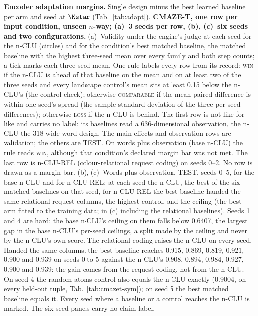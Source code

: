\textbf{Encoder adaptation margins.} Single design minus the best learned baseline per arm and seed at $\Kstar$ (Tab.~\ref{tab:adapt}).
\textbf{CMAZE-T, one row per input condition, unseen $n$-way; (a)~3 seeds per row, (b), (c)~six seeds and two configurations.} (a)~Validity under the engine's judge at each seed for the n-CLU (circles) and for the condition's best matched baseline, the matched baseline with the highest three-seed mean over every family and both step counts; a tick marks each three-seed mean. One rule labels every row from its record: \textsc{win} if the n-CLU is ahead of that baseline on the mean and on at least two of the three seeds and every landscape control's mean sits at least 0.15 below the n-CLU's (the control check); otherwise \textsc{comparable} if the mean paired difference is within one seed's spread (the sample standard deviation of the three per-seed differences); otherwise \textsc{loss} if the n-CLU is behind. The first row is not like-for-like and carries no label: its baselines read a 636-dimensional observation, the n-CLU the 318-wide word design. The main-effects and observation rows are validation; the others are TEST. On words plus observation (base n-CLU) the rule reads \textsc{win}, although that condition's declared margin bar was not met. The last row is n-CLU-REL (colour-relational request coding) on seeds 0--2. No row is drawn as a margin bar. (b), (c)~Words plus observation, TEST, seeds 0--5, for the base n-CLU and for n-CLU-REL: at each seed the n-CLU, the best of the six matched baselines on that seed, for n-CLU-REL the best baseline handed the same relational request columns, the highest control, and the ceiling (the best arm fitted to the training data; in (c) including the relational baselines). Seeds 1 and 4 are hard: the base n-CLU's ceiling on them falls below 0.6407, the largest gap in the base n-CLU's per-seed ceilings, a split made by the ceiling and never by the n-CLU's own score. The relational coding raises the n-CLU on every seed. Handed the same columns, the best baseline reaches 0.915, 0.869, 0.819, 0.921, 0.900 and 0.939 on seeds 0 to 5 against the n-CLU's 0.908, 0.894, 0.984, 0.927, 0.900 and 0.939: the gain comes from the request coding, not from the n-CLU. On seed 4 the random-atoms control also equals the n-CLU exactly (0.9004, on every held-out tuple, Tab.~\ref{tab:cmazet-sym}); on seed 5 the best matched baseline equals it. Every seed where a baseline or a control reaches the n-CLU is marked. The six-seed panels carry no claim label.
